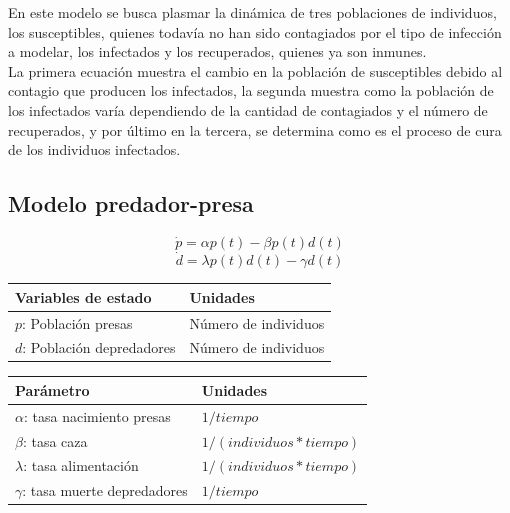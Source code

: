 \documentclass{article}
\begin{document}
        \vspace{0.5cm}

        En este modelo se busca plasmar la dinámica de tres poblaciones de
        individuos, los susceptibles, quienes todavía no han sido contagiados
        por el tipo de infección a modelar, los infectados y los recuperados,
        quienes ya son inmunes.\\

        La primera ecuación muestra el cambio en la población de
        susceptibles debido al contagio que producen los infectados, la
        segunda muestra como la población de los infectados varía
        dependiendo de la cantidad de contagiados y el número de recuperados, y
        por último en la tercera, se determina como es el proceso de cura
        de los individuos infectados.

    \subsection{Modelo predador-presa}

        \Large
        $$\dot{p} = \alpha p(t) - \beta p(t) d(t)$$
        $$\dot{d} = \lambda p(t) d(t) - \gamma d(t)$$
        \normalsize

        \vspace{0.5cm}

        \begin{tabular}[t]{|p{4cm} p{3.5cm}|}
            \hline
            \textbf{Variables de estado} & \textbf{Unidades} \\
            \hline
            $p$: Población presas       & Número de individuos\\
            $d$: Población depredadores & Número de individuos\\
            \hline
        \end{tabular}
        \hspace{0.5cm}
        \begin{tabular}[t]{|p{4.5cm} p{4cm}|}
            \hline
            \textbf{Parámetro} & \textbf{Unidades} \\
            \hline
            $\alpha$:  tasa nacimiento presas   & $1/tiempo$\\
            $\beta$:   tasa caza                & $1/(individuos * tiempo)$\\
            $\lambda$: tasa alimentación        & $1/(individuos * tiempo)$\\
            $\gamma$:  tasa muerte depredadores & $1/tiempo$\\
            \hline
        \end{tabular}
        \cite{predator}
\end{document}
